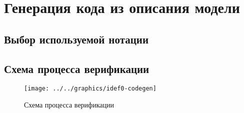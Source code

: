 \chapter{Генерация кода из описания модели}
\label{cha:code-gen}

\section{Выбор используемой нотации}
\label{sec:notation-choice}

\section{Схема процесса верификации}
\label{sec:idef0-codegen}

\begin{figure}[ht]
  \centering
  \texttt{[image: ../../graphics/idef0-codegen]}  
  \caption{Схема процесса верификации}
\label{fig:idef0-codegen}
\end{figure}

